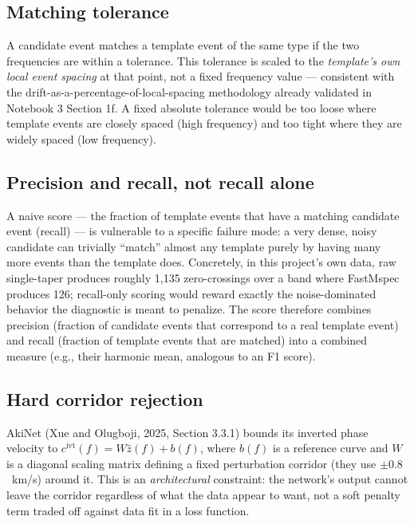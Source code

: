 \documentclass[11pt]{article}
\begin{document}
\subsection{Matching tolerance}

A candidate event matches a template event of the same type if the two frequencies are within a
tolerance. This tolerance is scaled to the \emph{template's own local event spacing} at that
point, not a fixed frequency value --- consistent with the drift-as-a-percentage-of-local-spacing
methodology already validated in Notebook 3 Section 1f. A fixed absolute tolerance would be too
loose where template events are closely spaced (high frequency) and too tight where they are
widely spaced (low frequency).

\subsection{Precision and recall, not recall alone}

A naive score --- the fraction of template events that have a matching candidate event (recall)
--- is vulnerable to a specific failure mode: a very dense, noisy candidate can trivially
``match'' almost any template purely by having many more events than the template does. Concretely,
in this project's own data, raw single-taper produces roughly 1{,}135 zero-crossings over a band
where FastMspec produces 126; recall-only scoring would reward exactly the noise-dominated
behavior the diagnostic is meant to penalize. The score therefore combines precision (fraction of
candidate events that correspond to a real template event) and recall (fraction of template
events that are matched) into a combined measure (e.g., their harmonic mean, analogous to an
F1 score).

\subsection{Hard corridor rejection}
\label{sec:corridor-rejection}

AkiNet (Xue and Olugboji, 2025, Section 3.3.1) bounds its inverted phase velocity to
$c^{\text{ivt}}(f) = W\hat{z}(f) + b(f)$, where $b(f)$ is a reference curve and $W$ is a diagonal
scaling matrix defining a fixed perturbation corridor (they use $\pm 0.8$~km/s) around it. This is
an \emph{architectural} constraint: the network's output cannot leave the corridor regardless of
what the data appear to want, not a soft penalty term traded off against data fit in a loss
function.
\end{document}
